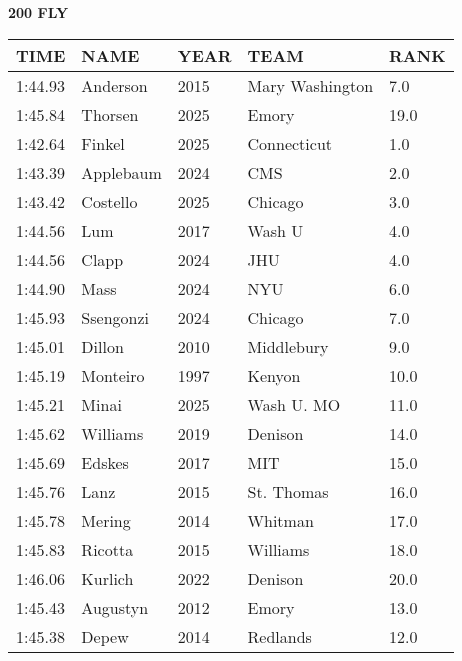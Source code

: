 \begin{minipage}[t]{0.48\textwidth}
\centering
\textbf{200 FLY}\\[0.05cm]
\begin{tabular}{@{}p{1.8cm}p{2.8cm}p{1.2cm}p{1.4cm}p{0.8cm}@{}}
\hline
\textbf{TIME} & \textbf{NAME} & \textbf{YEAR} & \textbf{TEAM} & \textbf{RANK} \\
\hline
1:44.93 & Anderson & 2015 & Mary Washington & 7.0 \\
1:45.84 & Thorsen & 2025 & Emory & 19.0 \\
1:42.64 & Finkel & 2025 & Connecticut & 1.0 \\
1:43.39 & Applebaum & 2024 & CMS & 2.0 \\
1:43.42 & Costello & 2025 & Chicago & 3.0 \\
1:44.56 & Lum & 2017 & Wash U & 4.0 \\
1:44.56 & Clapp & 2024 & JHU & 4.0 \\
1:44.90 & Mass & 2024 & NYU & 6.0 \\
1:45.93 & Ssengonzi & 2024 & Chicago & 7.0 \\
1:45.01 & Dillon & 2010 & Middlebury & 9.0 \\
1:45.19 & Monteiro & 1997 & Kenyon & 10.0 \\
1:45.21 & Minai & 2025 & Wash U. MO & 11.0 \\
1:45.62 & Williams & 2019 & Denison & 14.0 \\
1:45.69 & Edskes & 2017 & MIT & 15.0 \\
1:45.76 & Lanz & 2015 & St. Thomas & 16.0 \\
1:45.78 & Mering & 2014 & Whitman & 17.0 \\
1:45.83 & Ricotta & 2015 & Williams & 18.0 \\
1:46.06 & Kurlich & 2022 & Denison & 20.0 \\
1:45.43 & Augustyn & 2012 & Emory & 13.0 \\
1:45.38 & Depew & 2014 & Redlands & 12.0 \\
\hline
\end{tabular}
\end{minipage}

\vspace{0.4cm}

